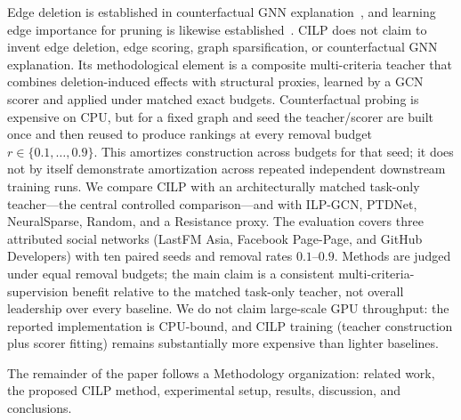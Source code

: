 Edge deletion is established in counterfactual GNN explanation~\citep{lucic2022cfgnn,pradoromero2022gretel,funke2022zorro,mastropietro2022edgeshaper}, and learning edge importance for pruning is likewise established~\citep{zheng2020neuralsparse,luo2021ptdnet,rong2020dropedge,li2020sgcn}.
CILP does not claim to invent edge deletion, edge scoring, graph sparsification, or counterfactual GNN explanation.
Its methodological element is a composite multi-criteria teacher that combines deletion-induced effects with structural proxies, learned by a GCN scorer and applied under matched exact budgets.
Counterfactual probing is expensive on CPU, but for a fixed graph and seed the teacher/scorer are built once and then reused to produce rankings at every removal budget $r\in\{0.1,\ldots,0.9\}$.
This amortizes construction across budgets for that seed; it does not by itself demonstrate amortization across repeated independent downstream training runs.
We compare CILP with an architecturally matched task-only teacher---the central controlled comparison---and with ILP-GCN, PTDNet, NeuralSparse, Random, and a Resistance proxy.
The evaluation covers three attributed social networks (LastFM Asia, Facebook Page-Page, and GitHub Developers) with ten paired seeds and removal rates $0.1$--$0.9$.
Methods are judged under equal removal budgets; the main claim is a consistent multi-criteria-supervision benefit relative to the matched task-only teacher, not overall leadership over every baseline.
We do not claim large-scale GPU throughput: the reported implementation is CPU-bound, and CILP training (teacher construction plus scorer fitting) remains substantially more expensive than lighter baselines.

The remainder of the paper follows a Methodology organization: related work, the proposed CILP method, experimental setup, results, discussion, and conclusions.
